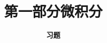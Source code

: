 




\title[Calculus]{\LARGE \bfseries 第一部分\quad 微积分} %
\author[Exercises] %
{\Large \bfseries 习题}
\date{}






\begin{frame}

\titlepage %

\end{frame}





